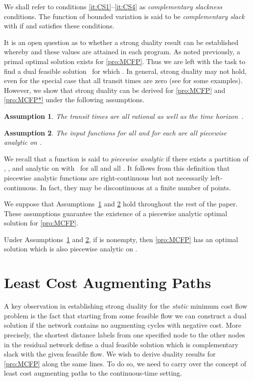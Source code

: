 \documentclass{svjour3}                     \smartqed
\newtheorem{asum}{Assumption}
\begin{document}
We shall refer to conditions \ref{it:CS1}--\ref{it:CS4} as \emph{complementary slackness} conditions.
The function  of bounded variation is said to be {\em complementary slack} with  if  and  satisfies these conditions.








It is an open question as to whether a strong duality result can be established whereby  and these values are attained in each program. As noted previously, a primal optimal solution exists for \eqref{pro:MCFP}. Thus we are left with the task to find a dual feasible solution~ for which . In general, strong duality may not hold, even for the special case that all transit times are zero (see \cite{Pullan97MMS} for some examples). However, we show that strong duality can be derived for \eqref{pro:MCFP} and \eqref{pro:MCFP*} under the following assumptions.

\begin{asum}
\label{asum:rational}
The transit times  are all rational as well as the time horizon~.
\end{asum}

\begin{asum}
\label{asum:analytic}
The input functions  for all  and  for each  are all piecewise
analytic on .
\end{asum}

We recall that a function  is said to \emph{piecewise analytic} if there exists a partition  of , , and  analytic on  with~ for all  and all . It follows from this definition that piecewise analytic functions are right-continuous but not necessarily left-continuous. In fact, they may be discontinuous at a finite number of points.

We suppose that Assumptions~\ref{asum:rational} and \ref{asum:analytic} hold throughout the rest of the paper. These assumptions guarantee the existence of a piecewise analytic optimal solution for \eqref{pro:MCFP}.

\begin{theorem} 
\label{thm:analytic-flow}
Under Assumptions~\ref{asum:rational} and \ref{asum:analytic}, if  is nonempty, then \eqref{pro:MCFP} has an optimal solution which is also piecewise analytic on .
\end{theorem}

\section{Least Cost Augmenting Paths}
\label{sex:SAP}
A key observation in establishing strong duality for the \emph{static} minimum cost flow problem is the fact that starting from some feasible flow we can construct a dual solution if the network contains no augmenting cycles with negative cost. More precisely, the shortest distance labels from one specified node to the other nodes in the residual network define a dual feasible solution which is complementary slack with the given feasible flow. We wish to derive duality results for \eqref{pro:MCFP} along the same lines. To do so, we need to carry over the concept of least cost augmenting paths to the continuous-time setting. 
\end{document}
